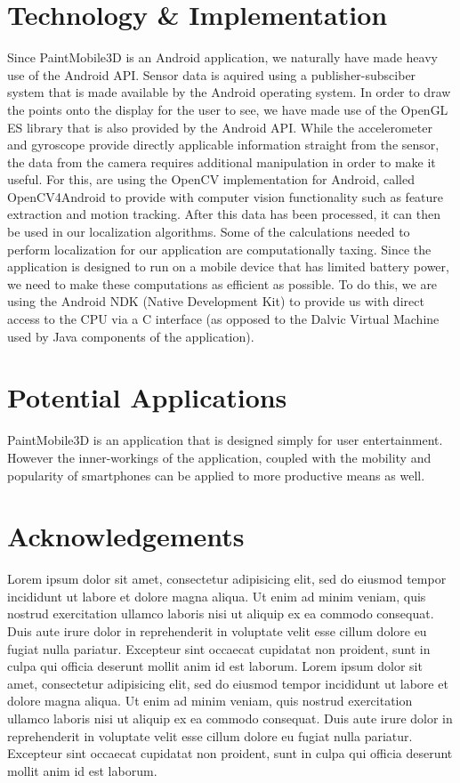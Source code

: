 \documentclass{chi-ext}
\begin{document}
\section{Technology \& Implementation}

Since PaintMobile3D is an Android application, we naturally have made heavy use of the Android API. Sensor data is aquired using a publisher-subsciber system that is made available by the Android operating system. In order to draw the points onto the display for the user to see, we have made use of the OpenGL ES library that is also provided by the Android API. While the accelerometer and gyroscope provide directly applicable information straight from the sensor, the data from the camera requires additional manipulation in order to make it useful. For this, are using the OpenCV implementation for Android, called OpenCV4Android to provide with computer vision functionality such as feature extraction and motion tracking. After this data has been processed, it can then be used in our localization algorithms. Some of the calculations needed to perform localization for our application are computationally taxing. Since the application is designed to run on a mobile device that has limited battery power, we need to make these computations as efficient as possible. To do this, we are using the Android NDK (Native Development Kit) to provide us with direct access to the CPU via a C interface (as opposed to the Dalvic Virtual Machine used by Java components of the application).

\section{Potential Applications}

PaintMobile3D is an application that is designed simply for user entertainment. However the inner-workings of the application, coupled with the mobility and popularity of smartphones can be applied to more productive means as well.

\section{Acknowledgements}

Lorem ipsum dolor sit amet, consectetur adipisicing elit, sed do eiusmod tempor incididunt ut labore et dolore magna aliqua. Ut enim ad minim veniam, quis nostrud exercitation ullamco laboris nisi ut aliquip ex ea commodo consequat. Duis aute irure dolor in reprehenderit in voluptate velit esse cillum dolore eu fugiat nulla pariatur. Excepteur sint occaecat cupidatat non proident, sunt in culpa qui officia deserunt mollit anim id est laborum. Lorem ipsum dolor sit amet, consectetur adipisicing elit, sed do eiusmod tempor incididunt ut labore et dolore magna aliqua. Ut enim ad minim veniam, quis nostrud exercitation ullamco laboris nisi ut aliquip ex ea commodo consequat. Duis aute irure dolor in reprehenderit in voluptate velit esse cillum dolore eu fugiat nulla pariatur. Excepteur sint occaecat cupidatat non proident, sunt in culpa qui officia deserunt mollit anim id est laborum.


\balance



\end{document}
